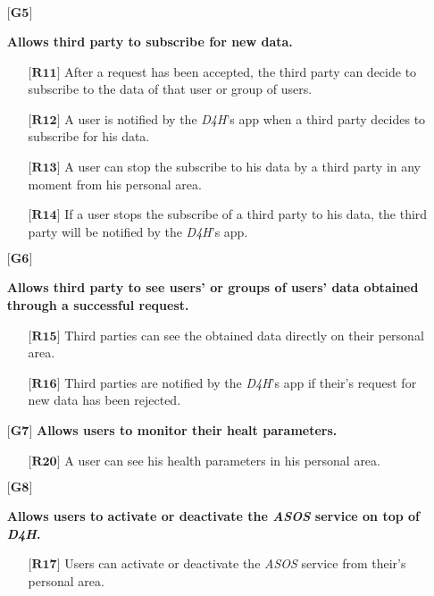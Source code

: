 \begin{itemize}
	\item[${\textbf{[G5]}}$] {\textbf{Allows third party to subscribe for new data.}
		\begin{itemize}
			\item[$\textbf{[R11]}$] {After a request has been accepted, the third party can decide to subscribe to the data of that user or group of users.}
			\item[$\textbf{[R12]}$] {A user is notified by the \hbox{\emph{D4H}}'s app when a third party decides to subscribe for his data.}
			\item[$\textbf{[R13]}$] {A user can stop the subscribe to his data by a third party in any moment from his personal area.}
			\item[$\textbf{[R14]}$] {If a user stops the subscribe of a third party to his data, the third party will be notified by the \hbox{\emph{D4H}}'s app.}
		\end{itemize}}


	\item[${\textbf{[G6]}}$] {\textbf{Allows third party to see users' or groups of users' data obtained through a successful request.}
		\begin{itemize}
			\item[$\textbf{[R15]}$] {Third parties can see the obtained data directly on their personal area.}
			\item[$\textbf{[R16]}$] {Third parties are notified by the \hbox{\emph{D4H}}'s app if their's request for new data has been rejected.}
		\end{itemize}}

	\item[${\textbf{[G7]}}$] {\textbf{Allows users to monitor their healt parameters.}}
		\begin{itemize}
			\item[$\textbf{[R20]}$] {A user can see his health parameters in his personal area.}
		\end{itemize}

	\item[${\textbf{[G8]}}$] {\textbf{Allows users to activate or deactivate the \hbox{\emph{ASOS}} service on top of \hbox{\emph{D4H}}.}
		\begin{itemize}
			\item[$\textbf{[R17]}$] {Users can activate or deactivate the \hbox{\emph{ASOS}} service from their's personal area.}
		\end{itemize}}



\end{itemize}
